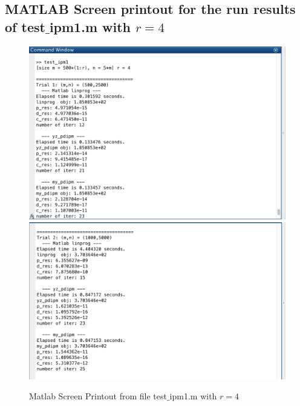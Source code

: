 \subsection*{MATLAB Screen printout for the run results of test$\_$ipm1.m with $r=4$}
\begin{figure}[H]
\centering
\includegraphics[width=15cm]{f_13}
\includegraphics[width=15cm]{f_14}
\caption{Matlab Screen Printout from file test$\_$ipm1.m with $r=4$}
\end{figure}
